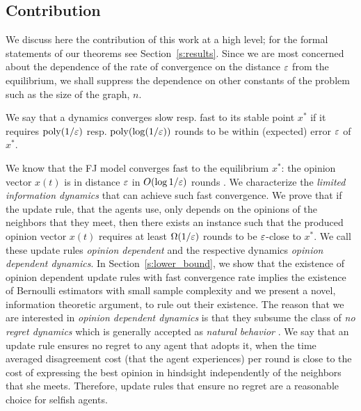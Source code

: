 \subsection{Contribution}
We discuss here the contribution of this work at a high level; for
the formal statements of our theorems see Section~\ref{s:results}.
Since we are most concerned about the dependence of the rate of convergence
on the distance $\varepsilon$ from the equilibrium, we shall suppress the dependence on
other constants of the problem such as the size of the graph, $n$.
\begin{definition}\label{d:convergence_rate}
  We say that a dynamics converges slow resp. fast to its stable point $x^*$ if it
  requires $\mathrm{poly}(1/\varepsilon)$ resp. $\mathrm{poly}(\log(1/\varepsilon))$ rounds to be
  within (expected) error $\varepsilon$ of $x^*$.
\end{definition}

 We know that the FJ model converges fast to the equilibrium $x^*$: the opinion vector
 $x(t)$ is in distance $\varepsilon$ in $O(\log 1/\varepsilon)$ rounds \cite{GS14}.  We characterize
 the \emph{limited
  information dynamics} that can achieve such fast convergence.  We prove that
if the update rule, that the agents use, only depends on the opinions of the
neighbors that they meet, then there exists an instance such that the produced
opinion vector $x(t)$ requires at least $\Omega(1/\varepsilon)$ rounds to be
$\varepsilon$-close to $x^*$. We call these update rules \emph{opinion dependent} and
the respective dynamics \emph{opinion dependent dynamics}.  In
Section~\ref{s:lower_bound}, we show that the existence of opinion dependent
update rules with fast convergence rate implies the existence of Bernoulli
estimators with small sample complexity and we present a novel, information
theoretic argument, to rule out their existence.  The reason that we are
interested in \emph{opinion dependent dynamics} is that they subsume the class
of \emph{no regret dynamics} which is generally accepted as
\emph{natural behavior}  \cite{EMN09}.
We say that an update rule ensures no regret to any agent that adopts it, when
the time averaged disagreement cost (that the agent experiences) per round is
close to the cost of expressing the best opinion in hindsight independently of
the neighbors that she meets. Therefore, update rules that ensure no regret are
a reasonable choice for selfish agents.

